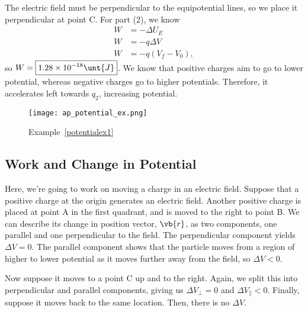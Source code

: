 \documentclass[11pt]{article}
\begin{document}
\begin{solution}
    The electric field must be perpendicular to the equipotential lines, so we place it perpendicular at point C. For part (2), we know
    \begin{align*}
        W &= -\Delta U_E \\
        W &= -q\Delta V \\
        W &= -q(V_f - V_0),
    \end{align*}
    so $W = \boxed{1.28\times 10^{-18}\unt{J}}$. We know that positive charges aim to go to lower potential, whereas negative charges go to higher potentials. Therefore, it accelerates left towards $q_2$, increasing potential.
\end{solution}
\begin{figure}[H]
    \centering
    \texttt{[image: ap\_potential\_ex.png]}
    \caption{Example~\ref{potentialex1}}
\end{figure}
\subsection{Work and Change in Potential}
Here, we're going to work on moving a charge in an electric field. Suppose that a positive charge at the origin generates an electric field. Another positive charge is placed at point A in the first quadrant, and is moved to the right to point B. We can describe its change in position vector, $\vb{r}$, as two components, one parallel and one perpendicular to the field. The perpendicular component yields $\Delta V = 0$. The parallel component shows that the particle moves from a region of higher to lower potential as it moves further away from the field, so $\Delta V < 0$.

Now suppose it moves to a point C up and to the right. Again, we split this into perpendicular and parallel components, giving us $\Delta V_{\perp} = 0$ and $\Delta V_{\parallel} < 0$. Finally, suppose it moves back to the same location. Then, there is no $\Delta V$.
\end{document}

